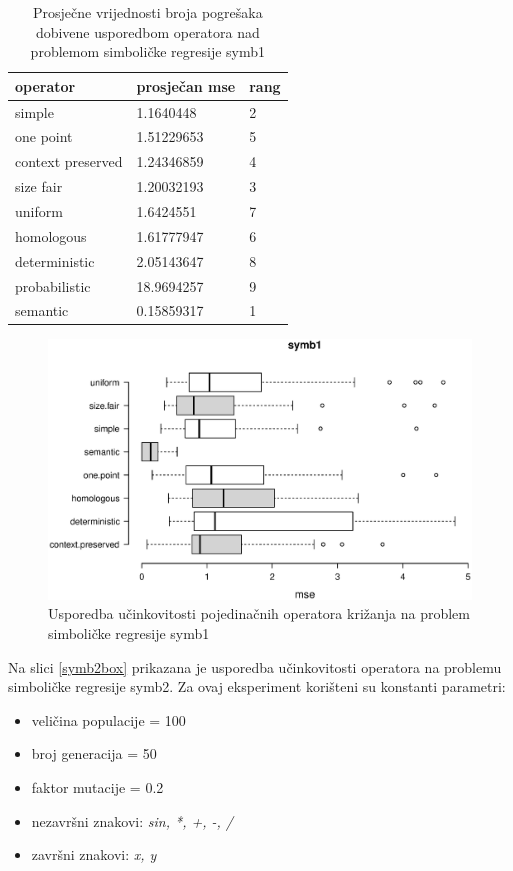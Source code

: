\begin{table}[H]
 	\centering
 \caption{Prosječne vrijednosti broja pogrešaka dobivene usporedbom operatora nad problemom simboličke regresije symb1}
    \begin{tabular}{| l | l | l |}
    \hline
    \textbf{operator} & \textbf{prosječan mse} & \textbf{rang}\\ \hline
    simple & 1.1640448 & 2\\ \hline
    one point & 1.51229653 & 5\\ \hline
    context preserved & 1.24346859 & 4\\ \hline
    size fair & 1.20032193 & 3\\ \hline
    uniform & 1.6424551 & 7\\ \hline
    homologous & 1.61777947 & 6\\ \hline
    deterministic & 2.05143647 & 8\\ \hline
    probabilistic & 18.9694257 & 9\\ \hline
    semantic & 0.15859317 & 1\\ \hline
    \end{tabular}
    
   
    \label{symb1table}
\end{table}

\begin{figure}[H]
	\centering
	\includegraphics[trim=0cm 4cm 0cm 0cm, scale=0.6]{./slike/boxPlots/symb1.eps}
	\caption{Usporedba učinkovitosti pojedinačnih operatora križanja na problem simboličke regresije symb1}
	\label{symb1box}
\end{figure}



Na slici \ref{symb2box} prikazana je usporedba učinkovitosti operatora na problemu simboličke regresije symb2. Za ovaj eksperiment korišteni su konstanti parametri:
\begin{itemize}
\item{veličina populacije = 100}
\item{broj generacija = 50}
\item{faktor mutacije = 0.2}
\item{nezavršni znakovi: \textit{sin, *, +, -, /}}
\item{završni znakovi: \textit{x, y}}
\end{itemize} 

